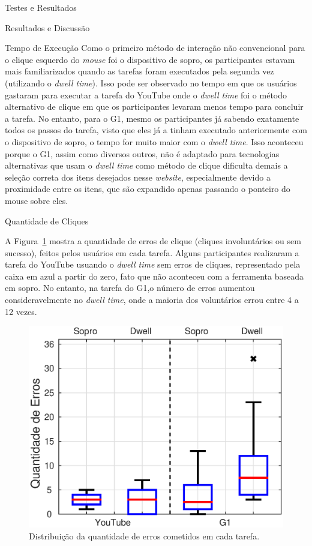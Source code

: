 \begin{chapter}{Testes e Resultados}
\begin{section}{Resultados e Discussão}
\begin{subsection}{Tempo de Execução}
Como o primeiro método de interação não convencional para o clique esquerdo do
\textit{mouse} foi o dispositivo de sopro, os participantes estavam mais
familiarizados quando as tarefas foram executados pela segunda vez (utilizando o
\textit{dwell time}). Isso pode ser observado no tempo em que os usuários
gastaram para executar a tarefa do YouTube onde o \textit{dwell time} foi o
método alternativo de clique em que  os participantes levaram menos tempo para
concluir a tarefa. No entanto, para o G1, mesmo os participantes já sabendo
exatamente todos os passos do tarefa, visto que eles já a tinham executado
anteriormente com o dispositivo de sopro, o tempo for muito maior com o
\textit{dwell time}. Isso aconteceu porque o G1, assim como diversos outros, não
é adaptado para tecnologias alternativas que usam o \textit{dwell time} como
método de clique dificulta demais a seleção correta dos itens desejados nesse
\textit{website}, especialmente devido a proximidade entre os itens, que são
expandido apenas passando o ponteiro do mouse sobre eles.
\end{subsection}

\begin{subsection}{Quantidade de Cliques}

A Figura~\ref{fig:cliques} mostra a quantidade de erros de clique (cliques
involuntários ou sem sucesso), feitos pelos usuários em cada tarefa. Alguns
participantes realizaram a tarefa do YouTube usuando o \textit{dwell time} sem
erros de cliques, representado pela caixa em azul a partir do zero, fato que não
aconteceu com a ferramenta baseada em sopro. No entanto, na tarefa do G1,o
número de erros aumentou consideravelmente no \textit{dwell time}, onde a
maioria dos voluntários errou entre 4 a 12 vezes.

\begin{figure}[!h]
	\centering
	\includegraphics[width=1.00\linewidth]{fig/erros}
	\caption{Distribuição da quantidade de erros cometidos em cada tarefa.}
	\label{fig:cliques}
\end{figure}


\end{subsection}
\end{section}
\end{chapter}
